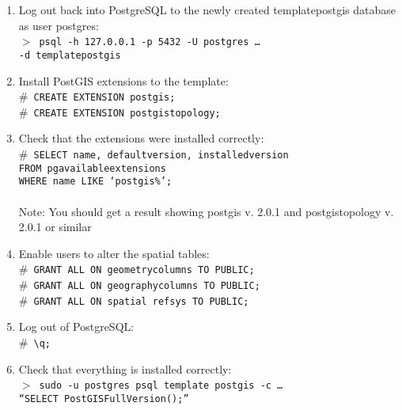 \begin{enumerate}
\begin{enumerate}
\begin{enumerate}
            \item Log out back into PostgreSQL to the newly created 
                  template\textunderscore postgis database as user postgres:\\ 
                  $>$~\texttt{psql -h 127.0.0.1 -p 5432 -U postgres \hfill \ldots \\
                  -d template\textunderscore postgis}
            \item Install PostGIS extensions to the template:\\ 
                  $\#$~\texttt{CREATE EXTENSION postgis;} \\
                  $\#$~\texttt{CREATE EXTENSION postgis\textunderscore topology;}
            \item Check that the extensions were installed correctly:\\ 
                  $\#$~\texttt{SELECT name, default\textunderscore version,
                  installed\textunderscore version\\ 
                  FROM pg\textunderscore available\textunderscore extensions\\ 
                  WHERE name LIKE `postgis\%';}\\
                  \\
                  Note: You should get a result showing postgis v. 
                  2.0.1 and postgis\textunderscore topology v. 2.0.1 or similar
            \item Enable users to alter the spatial tables:\\
                  $\#$~\texttt{GRANT ALL ON geometry\textunderscore columns TO 
                  PUBLIC;}\\
                  $\#$~\texttt{GRANT ALL ON geography\textunderscore columns TO 
                  PUBLIC;}\\
                  $\#$~\texttt{GRANT ALL ON spatial\textunderscore 
                  ref\textunderscore sys TO PUBLIC;}
            \item Log out of PostgreSQL:\\
                  $\#$~\texttt{\textbackslash q;}
            \item Check that everything is installed correctly:\\
                  $>$~\texttt{sudo -u postgres psql template\textunderscore 
                  postgis -c \hfill \ldots\\ 
                  ``SELECT 
                  PostGIS\textunderscore Full\textunderscore Version();''}

\end{enumerate}
\end{enumerate}
\end{enumerate}
